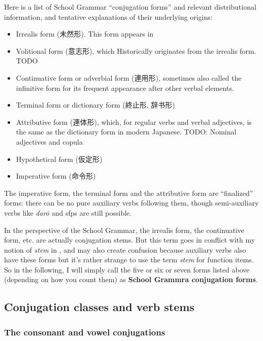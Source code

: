 \documentclass[UTF8, a4paper, oneside, scheme=plain]{ctexart}
\newcommand*{\concept}[1]{\textbf{#1}}
\newcommand*{\term}[1]{\emph{#1}}
\newcommand{\corpus}[1]{\emph{#1}}
\begin{document}
Here is a list of School Grammar ``conjugation forms'' and relevant distributional information,
and tentative explanations of their underlying origins:
\begin{itemize}
    \item Irrealis form (未然形). 
    This form appears in 
    \item Volitional form (意志形), which Historically originates from the irrealis form. TODO
    \item Continuative form or adverbial form (連用形), 
    sometimes also called the infinitive form
    for its frequent appearance after other verbal elements.
    \item Terminal form or dictionary form (終止形, 辞书形)
    \item Attributive form (連体形), which, for regular verbs and verbal adjectives, 
    is the same as the dictionary form in modern Japanese.
    TODO: Nominal adjectives and copula 
    \item Hypothetical form (仮定形)
    \item Imperative form (命令形)
\end{itemize}
The imperative form, the terminal form and the attributive form are ``finalized'' forms: 
there can be no pure auxiliary verbs following them,
though semi-auxiliary verbs like \corpus{dar\={o}} and \ac{sfp}s are still possible.

In the perspective of the School Grammar, the irrealis form, the continuative form, etc. 
are actually conjugation stems.
But this term goes in conflict with my notion of \term{stem} in ,
and may also create confusion because auxiliary verbs also have these forms 
but it's rather strange to use the term \term{stem} for function items.
So in the following,
I will simply call the five or six or seven forms listed above (depending on how you count them)
as \concept{School Grammra conjugation forms}.

\subsection{Conjugation classes and verb stems}\label{sec:conjugation-class}

\subsubsection{The consonant and vowel conjugations}
\end{document}
